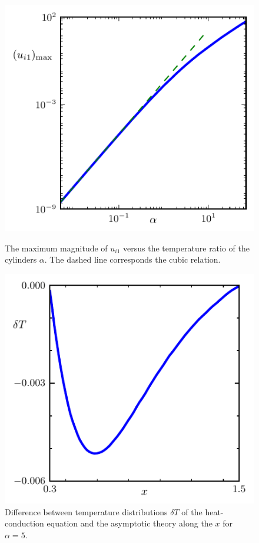 \documentclass[smallextended, referee]{svjour3} %
\begin{document}
\begin{figure}[ht]
	\centering
	\begin{minipage}{.48\textwidth}
		\centering
		\includegraphics{Fig10}
		\caption{The maximum magnitude of \(u_{i1}\) versus the temperature ratio of the cylinders \(\alpha\).
			The dashed line corresponds the cubic relation.}
		\label{fig:maxU}
	\end{minipage}
	\quad
	\begin{minipage}{.48\textwidth}
		\centering
		\includegraphics{Fig11}
		\caption{Difference between temperature distributions \(\delta T\) of the heat-conduction equation
			and the asymptotic theory along the \(x\) for \(\alpha = 5\).}
		\label{fig:deltaT}
	\end{minipage}
\end{figure}
\end{document}

